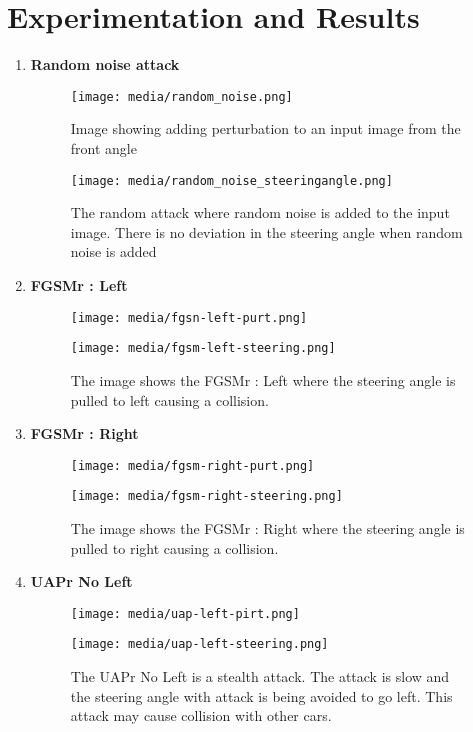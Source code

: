 \documentclass[ 12pt,a4paper,twocolumn,fleqn]{article}
\begin{document}
\section{Experimentation and Results}
\begin{enumerate}
    \item \textbf{Random noise attack}
    \begin{figure}[H]
    \texttt{[image: media/random\_noise.png]}
    \centering
    \caption{Image showing adding perturbation to an input image from the front angle}
    \end{figure}
    \begin{figure}[H]
    \texttt{[image: media/random\_noise\_steeringangle.png]}
    \centering
    \caption{The random attack where random noise is added to the input image.
    There is no deviation in the steering angle when random noise is added}
    \end{figure}
    
    \item \textbf{FGSMr : Left}
    \begin{figure}[H]
    \texttt{[image: media/fgsn-left-purt.png]}
    \centering
    \end{figure}
    \begin{figure}[H]
    \texttt{[image: media/fgsm-left-steering.png]}
    \centering
    \caption{The image shows the FGSMr : Left where the steering angle is pulled to left causing a collision.}
    \end{figure}
    
    \item \textbf{FGSMr : Right}
    \begin{figure}[H]
    \texttt{[image: media/fgsm-right-purt.png]}
    \centering
    \end{figure}
    \begin{figure}[H]
    \texttt{[image: media/fgsm-right-steering.png]}
    \centering
    \caption{The image shows the FGSMr : Right where the steering angle is pulled to right causing a collision.}
    \end{figure}
    
    \item \textbf{UAPr No Left}
    \begin{figure}[H]
    \texttt{[image: media/uap-left-pirt.png]}
    \centering
    \end{figure}
    \begin{figure}[H]
    \texttt{[image: media/uap-left-steering.png]}
    \centering
    \caption{The UAPr No Left is a stealth attack. The attack is slow and the steering angle with attack  is being avoided to go left. This attack may cause collision with other cars.}
    \end{figure}


\end{enumerate}
\end{document}
